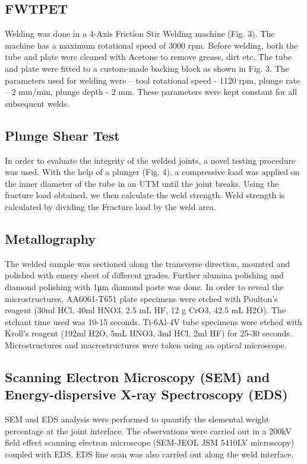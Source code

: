 \documentclass[preprint]{elsarticle}
\begin{document}
\subsection{FWTPET}
\label{subsec:FWTPET}
Welding was done in a 4-Axis Friction Stir Welding machine (Fig. 3). The machine has a maximum rotational speed of 3000 rpm. Before welding, both the tube and plate were cleaned with Acetone to remove grease, dirt etc. The tube and plate were fitted to a custom-made backing block as shown in Fig. 3. The parameters used for welding were – tool rotational speed - 1120 rpm, plunge rate – 2 mm/min, plunge depth - 2 mm. These parameters were kept constant for all subsequent welds.

\subsection{Plunge Shear Test}
\label{subsec:Plunge Shear Test}
In order to evaluate the integrity of the welded joints, a novel testing procedure was used. With the help of a plunger (Fig. 4), a compressive load was applied on the inner diameter of the tube in an UTM until the joint breaks. Using the fracture load obtained, we then calculate the weld strength. Weld strength is calculated by dividing the Fracture load by the weld area.

\subsection{Metallography}
\label{subsec:Metallography}
The welded sample was sectioned along the transverse direction, mounted and polished with emery sheet of different grades. Further alumina polishing and diamond polishing with 1μm diamond paste was done. In order to reveal the microstructures, AA6061-T651 plate specimens were etched with Poulton’s reagent (30ml HCl, 40ml HNO3, 2.5 mL HF, 12 g CrO3, 42.5 mL H2O). The etchant time used was 10-15 seconds. Ti-6Al-4V tube specimens were etched with Kroll’s reagent (192ml H2O, 5mL HNO3, 3ml HCl, 2ml HF) for 25-30 seconds. Microstructures and macrostructures were taken using an optical microscope.

\subsection{Scanning Electron Microscopy (SEM) and Energy-dispersive X-ray Spectroscopy (EDS)}
\label{subsec:SEM and EDS}
SEM and EDS analysis were performed to quantify the elemental weight percentage at the joint interface. The observations were carried out in a 200kV field effect scanning electron microscope (SEM-JEOL JSM 5410LV microscopy) coupled with EDS. EDS line scan was also carried out along the weld interface.
\end{document}
